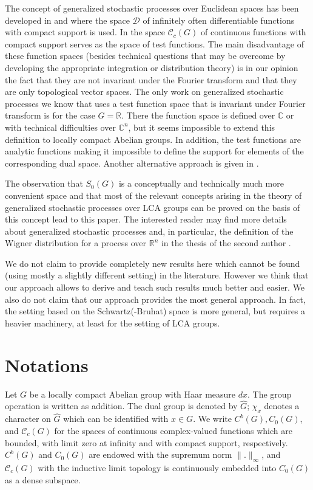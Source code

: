 \documentclass[graybox]{svmult}
\begin{document}
The concept of generalized stochastic processes over Euclidean spaces
has been developed in \cite{ge55,gevi64} and \cite{it54} %
where the space $\mathcal{D}$ of infinitely often differentiable functions
with compact support is used.  In \cite{ni75} the space $\mathcal{C}_c(G)$
of continuous functions with compact support serves as the space of test
functions.  The main disadvantage of these function spaces (besides
technical questions that may be overcome by developing the appropriate
integration or distribution theory) is in our opinion the fact that they
are not invariant under the Fourier transform and that they are only
topological vector spaces.  The only work on generalized stochastic
processes we know that uses a test function space that is invariant
under Fourier transform is \cite{ja79-1} for the case $G = \mathbb{R}$.
There the function space is defined over $\mathbb{C}$ or with technical difficulties over
$\mathbb{C}^n$, but it seems impossible to extend this definition to locally
compact Abelian groups. In addition, the test functions are analytic
functions   making it impossible to define the  support
for elements of  the corresponding dual space. Another alternative
approach is given in \cite{ob95}.

The observation that ${S_{0}(G)}$ is a conceptually and technically much more convenient space and that most of the relevant concepts arising in the theory of generalized stochastic processes over LCA  groups can be proved on the basis of this concept lead to this paper.  The interested reader may
find more details about generalized stochastic processes and, in
particular, the definition of the Wigner distribution for a process over
$\mathbb{R}^n$ in the thesis of the second author \cite{ho89}.

We do not claim to provide completely new results here which
cannot be found (using mostly a slightly different setting) in the literature.
However we think that our approach allows to derive and teach
such results much better and easier.
We also do not claim that our approach provides the
most general approach. In fact, the setting
based on the Schwartz(-Bruhat) space is more general,
but requires a  heavier machinery,
at least for the setting of LCA groups.

\section{Notations}

Let $G$ be a locally compact Abelian group with Haar measure $dx$. The group
operation is written as addition.  The dual group is denoted by
$\hat{G}$; $\chi_x$ denotes a character on $\hat{G}$ which can be
identified with $x \in G$. We write $C^{b}(G), C_{0}(G)$, and
$\mathcal{C}_c(G)$ %
for the spaces of continuous complex-valued functions which are
bounded, with limit zero at infinity and with compact support,
respectively. $C^{b}(G)$ and $C_{0}(G)$ are endowed with the supremum
norm $\| . \| _{\infty }$, and $\mathcal{C}_c(G)$ with the inductive limit
topology is continuously embedded into $C_{0}(G)$ as a dense
subspace.
\end{document}
